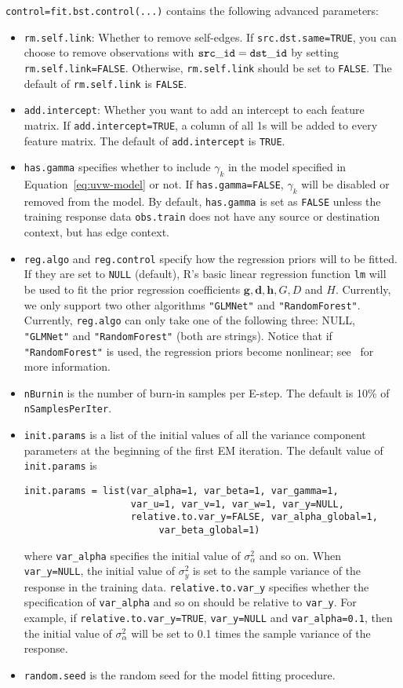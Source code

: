  {\tt control=fit.bst.control(...)} contains the following advanced parameters:
\begin{itemize}
\item {\tt rm.self.link}: Whether to remove self-edges.  If {\tt src.dst.same=TRUE}, you can choose to remove observations with ${\tt src\_id} = {\tt dst\_id}$ by setting {\tt rm.self.link=FALSE}.  Otherwise, {\tt rm.self.link} should be set to {\tt FALSE}. The default of {\tt rm.self.link} is {\tt FALSE}.
\item {\tt add.intercept}: Whether you want to add an intercept to each feature matrix.  If {\tt add.intercept=TRUE}, a column of all 1s will be added to every feature matrix. The default of {\tt add.intercept} is {\tt TRUE}.
\item {\tt has.gamma} specifies whether to include $\gamma_k$ in the model specified in Equation~\ref{eq:uvw-model} or not.  If {\tt has.gamma=FALSE}, $\gamma_k$ will be disabled or removed from the model.  By default, {\tt has.gamma} is set as {\tt FALSE} unless the training response data {\tt obs.train} does not have any source or destination context, but has edge context.
\item {\tt reg.algo} and {\tt reg.control} specify how the regression priors will to be fitted.  If they are set to {\tt NULL} (default), R's basic linear regression function {\tt lm} will be used to fit the prior regression coefficients $\bm{g}, \bm{d}, \bm{h}, G, D$ and $H$.  Currently, we only support two other algorithms {\tt "GLMNet"} and {\tt "RandomForest"}. Currently, {\tt reg.algo} can only take one of the following three: NULL, {\tt "GLMNet"} and {\tt "RandomForest"} (both are strings). Notice that if {\tt "RandomForest"} is used, the regression priors become nonlinear; see~\cite{gmf:recsys11} for more information.
\item {\tt nBurnin} is the number of burn-in samples per E-step. The default is 10\% of {\tt nSamplesPerIter}.
\item {\tt init.params} is a list of the initial values of all the variance component parameters at the beginning of the first EM iteration. The default value of {\tt init.params} is
{\small\begin{verbatim}
init.params = list(var_alpha=1, var_beta=1, var_gamma=1,
                   var_u=1, var_v=1, var_w=1, var_y=NULL,
                   relative.to.var_y=FALSE, var_alpha_global=1, 
					    var_beta_global=1)
\end{verbatim}}
where {\tt var\_alpha} specifies the initial value of $\sigma^2_\alpha$ and so on.  When {\tt var\_y=NULL}, the initial value of $\sigma^2_y$ is set to the sample variance of the response in the training data. {\tt relative.to.var\_y} specifies whether the specification of {\tt var\_alpha} and so on should be relative to {\tt var\_y}.  For example, if {\tt relative.to.var\_y=TRUE}, {\tt var\_y=NULL} and {\tt var\_alpha=0.1}, then the initial value of $\sigma^2_\alpha$ will be set to 0.1 times the sample variance of the response.
\item {\tt random.seed} is the random seed for the model fitting procedure.
\end{itemize}

